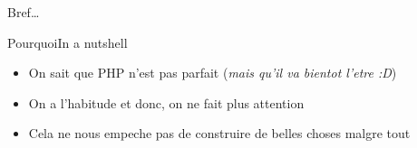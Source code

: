 \begin{frameC}{Bref\ldots}

\end{frameC}

\begin{frame}{Pourquoi}{In a nutshell}
    \begin{itemize}[<+->]
        \item On sait que PHP n'est pas parfait \pause[\thebeamerpauses] (\textit{mais qu'il va bientot l'etre :D})\pause[\thebeamerpauses]
        \item On a l'habitude et donc, on ne fait plus attention
        \item Cela ne nous empeche pas de construire de belles choses malgre tout
    \end{itemize}
\end{frame}
